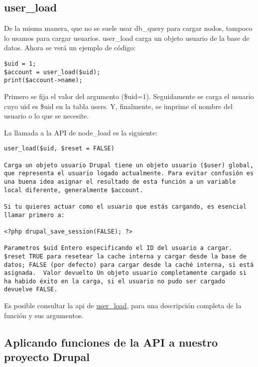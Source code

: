 \documentclass[11pt]{article}
\begin{document}
\subsection{user\_load}
\label{sec-1.3}


De la misma manera, que no se suele usar db\_query para cargar nodos,
tampoco lo usamos para cargar usuarios. user\_load carga un objeto
usuario de la base de datos.  Ahora se verá un ejemplo de código:


\begin{verbatim}
$uid = 1;
$account = user_load($uid);                                 
print($account->name);
\end{verbatim}



Primero se fija el valor del argumento (\$uid=1). Seguidamente se carga
el usuario cuyo uid es \$uid en la tabla users. Y, finalmente, se
imprime el nombre del usuario o lo que se necesite.  

La llamada a la API de node\_load es la siguiente:


\begin{verbatim}
user_load($uid, $reset = FALSE) 

Carga un objeto usuario Drupal tiene un objeto usuario ($user) global,
que representa el usuario logado actualmente. Para evitar confusión es
una buena idea asignar el resultado de esta función a un variable
local diferente, generalmente $account. 

Si tu quieres actuar como el usuario que estás cargando, es esencial
llamar primero a: 

<?php drupal_save_session(FALSE); ?> 

Parametros $uid Entero especificando el ID del usuario a cargar.
$reset TRUE para resetear la cache interna y cargar desde la base de
datos; FALSE (por defecto) para cargar desde la caché interna, si está
asignada.  Valor devuelto Un objeto usuario completamente cargado si
ha habido éxito en la carga, si el usuario no pudo ser cargado
devuelve FALSE.
\end{verbatim}



Es posible consultar la api de \href{http://api.drupal.org/api/drupal/modules--user--user.module/function/user_load/7}{user\_load}, para una descripción
completa de la función y sus argumentos.

\subsection{Aplicando funciones de la API a nuestro proyecto Drupal}
\label{sec-1.4}
\end{document}
